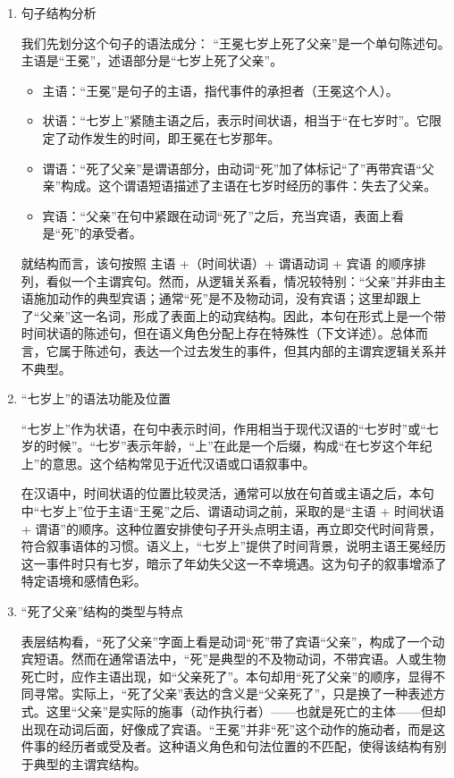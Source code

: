 \documentclass[10pt]{ctexart}
\begin{document}
\begin{enumerate}
    \item 句子结构分析
    
    我们先划分这个句子的语法成分： ``王冕七岁上死了父亲''是一个单句陈述句。主语是``王冕''，述语部分是``七岁上死了父亲''。
    \begin{itemize}
        \item 主语：``王冕''是句子的主语，指代事件的承担者（王冕这个人）。
        \item 状语：``七岁上''紧随主语之后，表示时间状语，相当于``在七岁时''。它限定了动作发生的时间，即王冕在七岁那年。
        \item 谓语：``死了父亲''是谓语部分，由动词``死''加了体标记``了''再带宾语``父亲''构成。这个谓语短语描述了主语在七岁时经历的事件：失去了父亲。
        \item 宾语：``父亲''在句中紧跟在动词``死了''之后，充当宾语，表面上看是``死''的承受者。
    \end{itemize}
    就结构而言，该句按照 主语 +（时间状语）+ 谓语动词 + 宾语 的顺序排列，看似一个主谓宾句。然而，从逻辑关系看，情况较特别：``父亲''并非由主语施加动作的典型宾语；通常``死''是不及物动词，没有宾语；这里却跟上了``父亲''这一名词，形成了表面上的动宾结构。因此，本句在形式上是一个带时间状语的陈述句，但在语义角色分配上存在特殊性（下文详述）。总体而言，它属于陈述句，表达一个过去发生的事件，但其内部的主谓宾逻辑关系并不典型。

    \item ``七岁上''的语法功能及位置
    
    ``七岁上''作为状语，在句中表示时间，作用相当于现代汉语的``七岁时''或``七岁的时候''。``七岁''表示年龄，``上''在此是一个后缀，构成``在七岁这个年纪上''的意思。这个结构常见于近代汉语或口语叙事中。

    在汉语中，时间状语的位置比较灵活，通常可以放在句首或主语之后，本句中``七岁上''位于主语``王冕''之后、谓语动词之前，采取的是``主语 + 时间状语 + 谓语''的顺序。这种位置安排使句子开头点明主语，再立即交代时间背景，符合叙事语体的习惯。语义上，``七岁上''提供了时间背景，说明主语王冕经历这一事件时只有七岁，暗示了年幼失父这一不幸境遇。这为句子的叙事增添了特定语境和感情色彩。

    \item ``死了父亲''结构的类型与特点
    
    表层结构看，``死了父亲''字面上看是动词``死''带了宾语``父亲''，构成了一个动宾短语。然而在通常语法中，``死''是典型的不及物动词，不带宾语。人或生物死亡时，应作主语出现，如``父亲死了''。本句却用``死了父亲''的顺序，显得不同寻常。实际上，``死了父亲''表达的含义是``父亲死了''，只是换了一种表述方式。这里``父亲''是实际的施事（动作执行者）——也就是死亡的主体——但却出现在动词后面，好像成了宾语。``王冕''并非``死''这个动作的施动者，而是这件事的经历者或受及者。这种语义角色和句法位置的不匹配，使得该结构有别于典型的主谓宾结构。
    

\end{enumerate}
\end{document}
